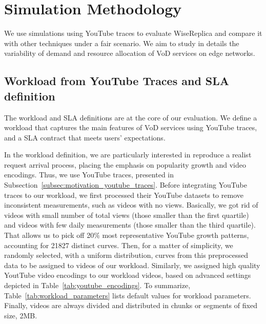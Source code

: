 \section{Simulation Methodology}
\label{sec:simulation_methodology}

We use simulations using YouTube traces to evaluate WiseReplica and compare it with other techniques under a fair scenario. We aim to study in details the variability of demand and resource allocation of VoD services on edge networks.

\subsection{Workload from YouTube Traces and SLA definition}
\label{subsec:methodology_workload}

The workload and SLA definitions are at the core of our evaluation. We define a workload that captures the main features of VoD services using YouTube traces, and a SLA contract that meets users' expectations. 
 
In the workload definition, we are particularly interested in reproduce a realist request arrival process, placing the emphasis on popularity growth and video encodings. Thus, we use YouTube traces, presented in Subsection~\ref{subsec:motivation_youtube_traces}. Before integrating YouTube traces to our workload, we first processed their YouTube datasets to remove inconsistent measurements, such as videos with no views. Basically, we got rid of videos with small number of total views (those smaller than the first quartile) and videos with few daily measurements (those smaller than the third quartile). That allows us to pick off 20\% most representative YouTube growth patterns, accounting for 21827 distinct curves. Then, for a matter of simplicity, we randomly selected, with a uniform distribution, curves from this preprocessed data to be assigned to videos of our workload. Similarly, we assigned high quality YoutTube video encodings  to our workload videos, based on advanced settings depicted in Table~\ref{tab:youtube_encodings}. To summarize, Table~\ref{tab:workload_parameters} lists default values for workload parameters. Finally, videos are always divided and distributed in chunks or segments of fixed size, 2MB.

